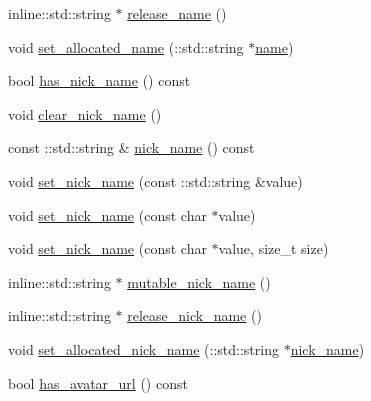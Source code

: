 \begin{DoxyCompactItemize}
\item 
inline\+::std\+::string $\ast$ \hyperlink{class_i_m_1_1_base_define_1_1_client_user_info_a3aff9eb1b34688631322ffd6a98ebb0d}{release\+\_\+name} ()
\item 
void \hyperlink{class_i_m_1_1_base_define_1_1_client_user_info_a46fdfb04eddb354d2ab709606c74ff5c}{set\+\_\+allocated\+\_\+name} (\+::std\+::string $\ast$\hyperlink{class_i_m_1_1_base_define_1_1_client_user_info_a0d5ddf534d63265f08b921de140b1be5}{name})
\item 
bool \hyperlink{class_i_m_1_1_base_define_1_1_client_user_info_a0d446d46fed7c9275e33f73ac7211963}{has\+\_\+nick\+\_\+name} () const 
\item 
void \hyperlink{class_i_m_1_1_base_define_1_1_client_user_info_a53b66a8e37d812ff66097cb89c96e6d2}{clear\+\_\+nick\+\_\+name} ()
\item 
const \+::std\+::string \& \hyperlink{class_i_m_1_1_base_define_1_1_client_user_info_acc6f28c711bd081349766287b6a6a910}{nick\+\_\+name} () const 
\item 
void \hyperlink{class_i_m_1_1_base_define_1_1_client_user_info_a34f98c77d1d48a07982375fda82def6a}{set\+\_\+nick\+\_\+name} (const \+::std\+::string \&value)
\item 
void \hyperlink{class_i_m_1_1_base_define_1_1_client_user_info_aebb9d4475a96557813bea9ad83ffb66c}{set\+\_\+nick\+\_\+name} (const char $\ast$value)
\item 
void \hyperlink{class_i_m_1_1_base_define_1_1_client_user_info_a3e8353df548fd288de563e1c20088278}{set\+\_\+nick\+\_\+name} (const char $\ast$value, size\+\_\+t size)
\item 
inline\+::std\+::string $\ast$ \hyperlink{class_i_m_1_1_base_define_1_1_client_user_info_a554ab0d1e12ca91e59f3eeda2c6ebb96}{mutable\+\_\+nick\+\_\+name} ()
\item 
inline\+::std\+::string $\ast$ \hyperlink{class_i_m_1_1_base_define_1_1_client_user_info_ae0ceba956b39e2d73bba6cee0d84cf6d}{release\+\_\+nick\+\_\+name} ()
\item 
void \hyperlink{class_i_m_1_1_base_define_1_1_client_user_info_a69ee7bb6302912e5c79d7064851ddf4b}{set\+\_\+allocated\+\_\+nick\+\_\+name} (\+::std\+::string $\ast$\hyperlink{class_i_m_1_1_base_define_1_1_client_user_info_acc6f28c711bd081349766287b6a6a910}{nick\+\_\+name})
\item 
bool \hyperlink{class_i_m_1_1_base_define_1_1_client_user_info_ab74d5853a24973b40bf2a163f62545a2}{has\+\_\+avatar\+\_\+url} () const 
\item 

\end{DoxyCompactItemize}
